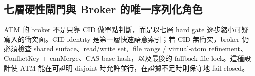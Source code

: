 \documentclass[a4paper,fontset=none]{ctexart}
\begin{document}
\subsection{七層硬性閘門與 Broker 的唯一序列化角色}

ATM 的 broker 不是只靠 CID 做單點判斷，而是以七層 hard gate 逐步縮小可疑寫入的衝突面。CID identity 是第一層快速語意索引；若 CID 無衝突，broker 仍必須檢查 shared surface、read/write set、file range / virtual-atom refinement、ConflictKey + canMerge、CAS base-hash，以及最後的 fallback file lock。這種設計使 ATM 能在可證明 disjoint 時允許並行，在證據不足時則保守地 fail closed。

\smallskip{}\par\smallskip
\end{document}
